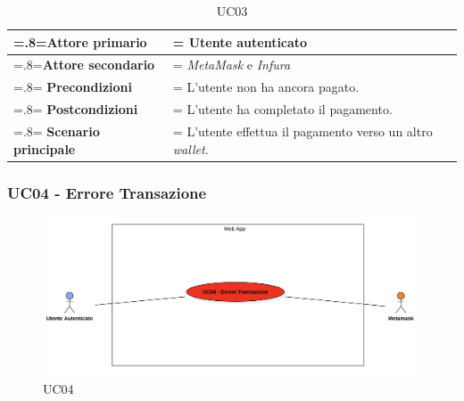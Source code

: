                 \begin{table}[H]
                    \centering
                    \renewcommand{\arraystretch}{1.8}
                    \renewcommand\tabularxcolumn[1]{m{#1}}
                    \begin{tabularx}{0.9\textwidth} {
                        >{\hsize=.8\hsize\linewidth=\hsize}X
                        >{\hsize=1.2\hsize\linewidth=\hsize}X}
                        \hline
                        \textbf{Attore primario} & Utente autenticato \\
                        \hline
                        \textbf{Attore secondario} & \textit{MetaMask} e \textit{Infura} \\
                        \hline
                        \textbf{Precondizioni} & L'utente non ha ancora pagato. \\
                        \hline
                        \textbf{Postcondizioni} & L'utente ha completato il pagamento. \\
                        \hline
                        \textbf{Scenario principale} & L'utente effettua il pagamento verso un altro \textit{wallet}. \\
                        \hline
                    \end{tabularx}
                    \caption{UC03}
                \end{table}

            \subsubsection{UC04 - Errore Transazione}
            \label{UC04}

            \begin{figure}[H]
                \centering
                \includegraphics[scale=0.4]{src/img/UC04.png}
                \caption{UC04}
            \end{figure}
    
